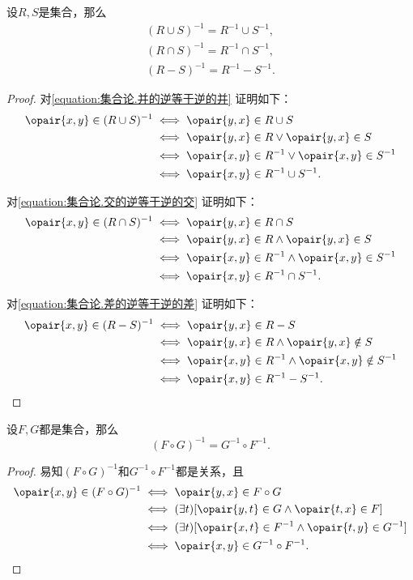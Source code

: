 \begin{theorem}
设\(R,S\)是集合，那么\begin{gather}
	(R \cup S)^{-1} = R^{-1} \cup S^{-1},
	\label{equation:集合论.并的逆等于逆的并} \\
	(R \cap S)^{-1} = R^{-1} \cap S^{-1},
	\label{equation:集合论.交的逆等于逆的交} \\
	(R - S)^{-1} = R^{-1} - S^{-1}.
	\label{equation:集合论.差的逆等于逆的差}
\end{gather}
\begin{proof}
对\cref{equation:集合论.并的逆等于逆的并} 证明如下：
\begin{align*}
	\opair{x,y} \in (R \cup S)^{-1}
	&\iff \opair{y,x} \in R \cup S \\
	&\iff \opair{y,x} \in R \lor \opair{y,x} \in S \\
	&\iff \opair{x,y} \in R^{-1} \lor \opair{x,y} \in S^{-1} \\
	&\iff \opair{x,y} \in R^{-1} \cup S^{-1}.
\end{align*}

对\cref{equation:集合论.交的逆等于逆的交} 证明如下：
\begin{align*}
	\opair{x,y} \in (R \cap S)^{-1}
	&\iff \opair{y,x} \in R \cap S \\
	&\iff \opair{y,x} \in R \land \opair{y,x} \in S \\
	&\iff \opair{x,y} \in R^{-1} \land \opair{x,y} \in S^{-1} \\
	&\iff \opair{x,y} \in R^{-1} \cap S^{-1}.
\end{align*}

对\cref{equation:集合论.差的逆等于逆的差} 证明如下：
\begin{align*}
	\opair{x,y} \in (R - S)^{-1}
	&\iff \opair{y,x} \in R - S \\
	&\iff \opair{y,x} \in R \land \opair{y,x} \notin S \\
	&\iff \opair{x,y} \in R^{-1} \land \opair{x,y} \notin S^{-1} \\
	&\iff \opair{x,y} \in R^{-1} - S^{-1}.
	\qedhere
\end{align*}
\end{proof}
\end{theorem}

\begin{theorem}\label{theorem:集合论.复合的逆}
设\(F,G\)都是集合，那么\[
	(F \circ G)^{-1} = G^{-1} \circ F^{-1}.
\]
\begin{proof}
易知\((F \circ G)^{-1}\)和\(G^{-1} \circ F^{-1}\)都是关系，且\begin{align*}
	\opair{x,y} \in (F \circ G)^{-1}
	&\iff
	\opair{y,x} \in F \circ G \\
	&\iff
	(\exists t)[\opair{y,t} \in G \land \opair{t,x} \in F] \\
	&\iff
	(\exists t)[\opair{x,t} \in F^{-1} \land \opair{t,y} \in G^{-1}] \\
	&\iff
	\opair{x,y} \in G^{-1} \circ F^{-1}.
	\qedhere
\end{align*}
\end{proof}
\end{theorem}

